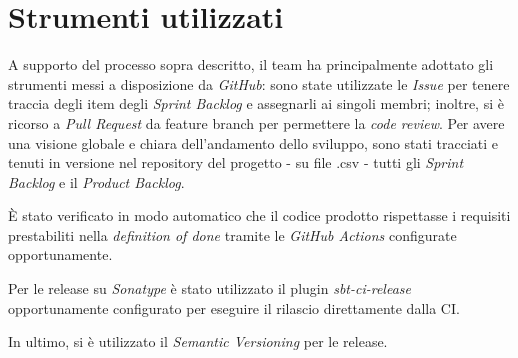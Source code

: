 \section{Strumenti utilizzati}\label{sec:strumenti-utilizzati}
A supporto del processo sopra descritto, il team ha principalmente adottato gli strumenti messi a disposizione da
\textit{GitHub}: sono state utilizzate le \textit{Issue} per tenere traccia degli item degli \textit{Sprint Backlog} e
assegnarli ai singoli membri;
inoltre, si è ricorso a \textit{Pull Request} da feature branch per permettere la \textit{code review}.
Per avere una visione globale e chiara dell'andamento dello sviluppo, sono stati tracciati e tenuti in versione nel
repository del progetto - su file .csv - tutti gli \textit{Sprint Backlog} e il \textit{Product Backlog}.

È stato verificato in modo automatico che il codice prodotto rispettasse i requisiti prestabiliti nella
\textit{definition of done} tramite le \textit{GitHub Actions} configurate opportunamente.

Per le release su \textit{Sonatype} è stato utilizzato il plugin \textit{sbt-ci-release}\cite{sbt-ci-release}
opportunamente configurato per eseguire il rilascio direttamente dalla CI\@.

In ultimo, si è utilizzato il \textit{Semantic Versioning} per le release.
